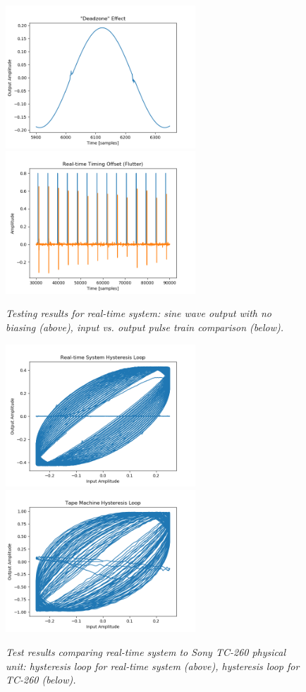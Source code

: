 \documentclass[twoside,a4paper]{article}
\begin{document}
\begin{figure}[ht]
    \center
    \includegraphics[width=2.8in]{../Testing/DeadzoneTest.png}
    \includegraphics[width=2.8in]{../Testing/FlutterTest.png}
    \caption{\label{tests}{\it Testing results for real-time system:
                            sine wave output with no biasing (above),
                            input vs. output pulse train comparison (below).}}
\end{figure}
%
\begin{figure}[ht]
    \center
    \includegraphics[width=2.8in]{../Testing/HysteresisTest.png}
    \includegraphics[width=2.8in]{../Testing/HysteresisTest_Tape.png}
    \caption{\label{tests2}{\it Test results comparing real-time system
                                to Sony TC-260 physical unit:
                                hysteresis loop for real-time system (above),
                                hysteresis loop for TC-260 (below).}}
\end{figure}
%
\end{document}
